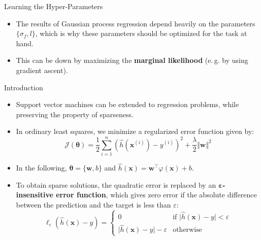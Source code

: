 \begin{frame}
\end{frame}


\begin{dwHeaderFrame}{Learning the Hyper-Parameters}
	\begin{itemize}
		\item The results of Gaussian process regression depend heavily on the parameters $\{ \sigma_f, l \}$, which is why these parameters should be optimized for the task at hand.
		\item This can be down by maximizing the \textbf{marginal likelihood} (e.\,g. by using gradient ascent).
	\end{itemize}
	
\end{dwHeaderFrame}



\begin{dwHeaderFrame}{Introduction}
	\begin{itemize}
		\item Support vector machines can be extended to regression problems, while preserving the property of sparseness.
		\item In ordinary least squares, we minimize a regularized error function given by:
		\begin{equation}
			\mathcal{J}(\bm{\theta}) = \frac{1}{2} \sum_{i=1}^n (\widehat{h}(\bm{x}^{(i)}) - y^{(i)})^2 + \frac{\lambda}{2} \Vert \bm{w} \Vert^2
		\end{equation}
		\item In the following, $\bm{\theta} = \{ \bm{w}, b \}$ and $\widehat{h}(\bm{x}) = \bm{w}^{\intercal} \varphi(\bm{x}) + b$.
		\item To obtain sparse solutions, the quadratic error is replaced by an \textbf{$\bm{\varepsilon}$-insensitive error function}, which gives zero error if the absolute difference between the
			prediction and the target is less than $\varepsilon$:
		\begin{equation}
			\ell_{\varepsilon}(\widehat{h}(\bm{x}) - y) =
			\begin{cases}
				0 									& \text{if $\vert \widehat{h}(\bm{x}) - y \vert < \varepsilon$} \\
				\vert \widehat{h}(\bm{x}) - y \vert - \varepsilon 	& \text{otherwise}
			\end{cases}
		\end{equation}
	\end{itemize}
\end{dwHeaderFrame}


